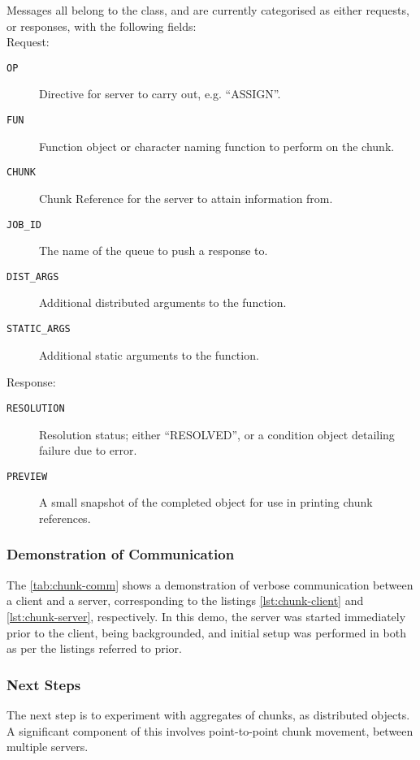 Messages all belong to the  class, and are currently categorised as either requests, or responses, with the following fields:\\

Request: \begin{description} \item[\texttt{OP}] Directive for server to carry out, e.g. ``ASSIGN''.
	\item[\texttt{FUN}] Function object or character naming function to
		perform on the chunk.
	\item[\texttt{CHUNK}] Chunk Reference for the server to attain
		information from.
	\item[\texttt{JOB\_ID}] The name of the queue to push a response to.
	\item[\texttt{DIST\_ARGS}] Additional distributed arguments to the
		function.
	\item[\texttt{STATIC\_ARGS}] Additional static arguments to the
		function.
\end{description}

Response: \begin{description} \item[\texttt{RESOLUTION}] Resolution status; either ``RESOLVED'', or a condition object detailing failure due to error.
	\item[\texttt{PREVIEW}]  A small snapshot of the completed object for
		use in printing chunk references.
\end{description}

\subsubsection{Demonstration of Communication}

The \cref{tab:chunk-comm} shows a demonstration of verbose communication between a client and a server, corresponding to the listings \cref{lst:chunk-client} and \cref{lst:chunk-server}, respectively.
In this demo, the server was started immediately prior to the client, being backgrounded, and initial setup was performed in both as per the listings referred to prior.



\subsubsection{Next Steps}

The next step is to experiment with aggregates of chunks, as distributed objects.
A significant component of this involves point-to-point chunk movement, between multiple servers.
